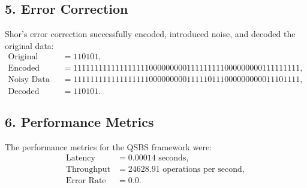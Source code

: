 \documentclass{article}
\theoremstyle{plain}
\begin{document}
\subsection*{5. Error Correction}
Shor's error correction successfully encoded, introduced noise, and decoded the original data:
\begin{align*}
\text{Original Data} &= 110101, \\
\text{Encoded Data} &= 111111111111111111000000000111111111000000000111111111, \\
\text{Noisy Data} &= 111111111111111111000000000111110111000000000011101111, \\
\text{Decoded Data} &= 110101.
\end{align*}

\subsection*{6. Performance Metrics}
The performance metrics for the QSBS framework were:
\begin{align*}
\text{Latency} &= 0.00014 \text{ seconds}, \\
\text{Throughput} &= 24628.91 \text{ operations per second}, \\
\text{Error Rate} &= 0.0.
\end{align*}



\end{document}
